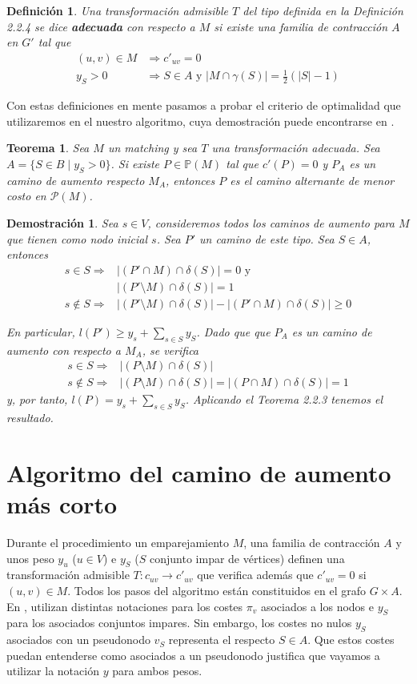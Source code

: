 \documentclass[twoside,a4paper,openright,12pt,tikz]{book}
\newtheorem{defi}{Definici\'on}[section]
\newtheorem{thm}{Teorema}[section]
\newtheorem*{dem}{Demostración}
\begin{document}
\begin{defi}
Una transformación admisible $T$ del tipo definida en la Definición 2.2.4 se dice \textbf{adecuada} con respecto a $M$ si existe una familia de contracción $A$ en $G'$ tal que
\begin{align*}
(u,v)\in M &\Rightarrow c'_{uv} = 0\\
y_S>0&\Rightarrow S\in A \text{ y } |M\cap \gamma(S)| = \frac{1}{2}(|S|-1)
\end{align*}
\end{defi}
Con estas definiciones en mente pasamos a probar el criterio de optimalidad que utilizaremos en el nuestro algoritmo, cuya demostración puede encontrarse en \cite{derigs}.
\begin{thm}
Sea $M$ un matching y sea $T$ una transformación adecuada. Sea $A = \{S \in B\mid y_S>0\}$. Si existe $P\in \mathbb{P}(M)$ tal que $c'(P)=0$ y $P_A$ es un camino de aumento respecto $M_A$, entonces $P$ es el camino alternante de menor costo en $\mathcal{P}(M)$.
\end{thm}
\begin{dem}
Sea $s\in V$, consideremos todos los caminos de aumento para $M$ que tienen como nodo inicial $s$. Sea $P'$ un camino de este tipo. Sea $S\in A$, entonces
\begin{align*}
s\in S \Rightarrow & |(P'\cap M)\cap \delta(S)| = 0 \text{ y}\\
& |(P'\setminus M)\cap \delta(S)| = 1\\
s\notin S \Rightarrow & |(P'\setminus M)\cap \delta(S)| - |(P'\cap M)\cap \delta(S)| \geq 0
\end{align*}

En particular, $l(P')\geq y_s + \sum_{s\in S}y_S$. Dado que que $P_A$  es un camino de aumento con respecto a $M_A$, se verifica
\begin{align*}
s\in S \Rightarrow & |(P\setminus M)\cap \delta(S)|\\
s\notin S \Rightarrow & |(P\setminus M)\cap \delta(S)| = |(P\cap M)\cap \delta(S)| =1
\end{align*}
y, por tanto, $l(P) = y_s  + \sum_{s\in S} y_S$. Aplicando el Teorema 2.2.3 tenemos el resultado.
\end{dem}
\section{Algoritmo del camino de aumento más corto}
Durante el procedimiento un emparejamiento $M$, una familia de contracción $A$ y unos peso $y_u$ ($u \in V$) e $y_S$ ($S$ conjunto impar de vértices) definen una transformación admisible $T:c_{uv}\to c'_{uv}$ que verifica además que $c'_{uv}=0$ si $(u,v)\in M$. Todos los pasos del algoritmo están constituidos en el grafo $G\times A$. En \cite{inte}, utilizan distintas notaciones para los costes $\pi_v$ asociados a los nodos e $y_S$ para los asociados conjuntos impares. Sin embargo, los costes no nulos $y_S$ asociados con un pseudonodo $v_S$ representa el respecto $S\in A$. Que estos costes puedan entenderse como asociados a un pseudonodo justifica que vayamos a utilizar la notación $y$ para ambos pesos. 
\end{document}
